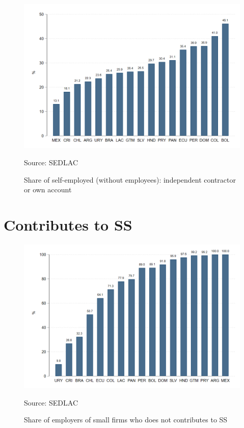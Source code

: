 \documentclass[english]{article}
\begin{document}
\begin{figure}[H]
            \justifying
                \caption{Share of self-employed (without employees): independent contractor or own account}  
            \centerline{\includegraphics[scale=.3]{latex/figures/Self-employed/independent.png}}
                \label{fig:independent}
                \footnotesize{Source: SEDLAC}
\end{figure}


\section{Contributes to SS}

\begin{figure}[H]
            \justifying
                \caption{Share of employers of small firms who does not contributes to SS}  
            \centerline{\includegraphics[scale=.3]{latex/figures/Self-employed/i_empgrowthfirm.png}}
                \label{fig:i-employers}
                \footnotesize{Source: SEDLAC}
\end{figure}
\end{document}
